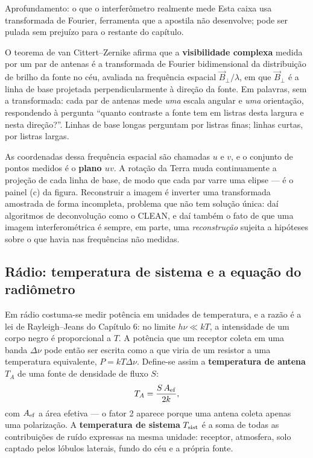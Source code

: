 \documentclass[11pt,a4paper]{article}
\begin{document}
\begin{lessonblock}[borderline west={2pt}{0pt}{astroBlue}]{Aprofundamento: o que o interferômetro realmente mede}
Esta caixa usa transformada de Fourier, ferramenta que a apostila não desenvolve; pode ser pulada sem prejuízo
para o restante do capítulo.

O teorema de van Cittert--Zernike afirma que a \textbf{visibilidade complexa} medida por um par de antenas é a
transformada de Fourier bidimensional da distribuição de brilho da fonte no céu, avaliada na frequência espacial
$\vec{B}_\perp/\lambda$, em que $\vec{B}_\perp$ é a linha de base projetada perpendicularmente à direção da
fonte. Em palavras, sem a transformada: cada par de antenas mede \emph{uma} escala angular e \emph{uma}
orientação, respondendo à pergunta ``quanto contraste a fonte tem em listras desta largura e nesta direção?''.
Linhas de base longas perguntam por listras finas; linhas curtas, por listras largas.

As coordenadas dessa frequência espacial são chamadas $u$ e $v$, e o conjunto de pontos medidos é o
\textbf{plano $uv$}. A rotação da Terra muda continuamente a projeção de cada linha de base, de modo que cada par
varre uma elipse --- é o painel (c) da figura. Reconstruir a imagem é inverter uma transformada amostrada de
forma incompleta, problema que não tem solução única: daí algoritmos de deconvolução como o CLEAN, e daí também
o fato de que uma imagem interferométrica é sempre, em parte, uma \emph{reconstrução} sujeita a hipóteses sobre
o que havia nas frequências não medidas.
\end{lessonblock}

\subsection*{Rádio: temperatura de sistema e a equação do radiômetro}

Em rádio costuma-se medir potência em unidades de temperatura, e a razão é a lei de Rayleigh--Jeans do Capítulo 6:
no limite $h\nu\ll kT$, a intensidade de um corpo negro é proporcional a $T$. A potência que um receptor coleta em
uma banda $\Delta\nu$ pode então ser escrita como a que viria de um resistor a uma temperatura equivalente,
$P=kT\Delta\nu$. Define-se assim a \textbf{temperatura de antena} $T_A$ de uma fonte de densidade de fluxo $S$:
\[
T_A=\frac{S\,A_{\rm ef}}{2k},
\]
com $A_{\rm ef}$ a área efetiva --- o fator 2 aparece porque uma antena coleta apenas uma polarização. A
\textbf{temperatura de sistema} $T_{\rm sist}$ é a soma de todas as contribuições de ruído expressas na mesma
unidade: receptor, atmosfera, solo captado pelos lóbulos laterais, fundo do céu e a própria fonte.
\end{document}
